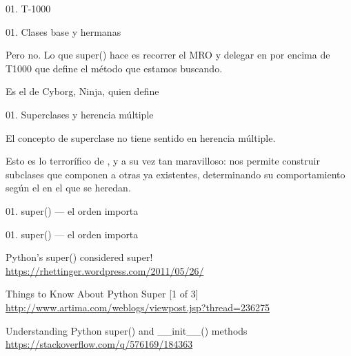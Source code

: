 \begin{frame}{01. T-1000}
  \scriptsize
\end{frame}

\begin{frame}{01. Clases base y hermanas}
  \footnotesize

  \vspace{0.5cm}

  \normalsize
  \begin{block}{}
    \center
    Pero no. Lo que super() hace es recorrer el MRO y delegar en
     por encima de T1000 que
    define el método que estamos buscando.
  \end{block}

  \begin{center}
    Es el  de Cyborg, Ninja, quien define
  \end{center}
\end{frame}

\begin{frame}{01. Superclases y herencia múltiple}
   \begin{alertblock}{}
     \Large
     \centering
     El concepto de superclase no tiene sentido en herencia múltiple.
  \end{alertblock}

  \begin{justify}
   Esto es lo terrorífico de , y a su vez tan
   maravilloso: nos permite construir subclases que componen a otras
   ya existentes, determinando su comportamiento según el
    en el que se heredan.
  \end{justify}
\end{frame}

\begin{frame}{01. super() — el orden importa}
  \scriptsize
\end{frame}

\begin{frame}{01. super() — el orden importa}

  \footnotesize
  \begin{block}{\centering Python’s super() considered super!}
    \centering \url{https://rhettinger.wordpress.com/2011/05/26/}
  \end{block}

  \begin{block}{\centering Things to Know About Python Super [1 of 3]}
    \centering \url{http://www.artima.com/weblogs/viewpost.jsp?thread=236275}
  \end{block}

  \begin{block}{\centering Understanding Python super() and \_\_init\_\_() methods}
    \centering \url{https://stackoverflow.com/q/576169/184363}
  \end{block}
\end{frame}

